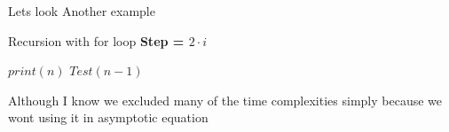 \documentclass[]{article}
\theoremstyle{plain}
\theoremstyle{definition}
\begin{document}
Lets look Another example
\begin{algorithm}[H]
    \caption{Recursion with for loop \textbf{Step = $2 \cdot i$} }
    \label{printRecursion}
    \begin{algorithmic}
         
             
                \State$print(n)$ 
            \EndFor
            \State$Test(n-1)$   
        \EndIf
        \EndProcedure
    \end{algorithmic}
\end{algorithm}

Although I know we excluded many of the time complexities simply because we wont using it in asymptotic equation
\end{document}
